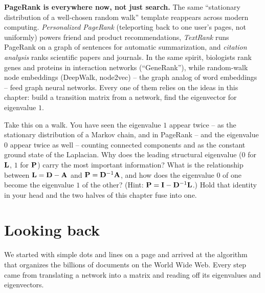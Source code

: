 \begin{applicationbox}
\textbf{PageRank is everywhere now, not just search.} The same ``stationary distribution of
a well-chosen random walk'' template reappears across modern computing.
\emph{Personalized PageRank} (teleporting back to one user's pages, not uniformly) powers
friend and product recommendations, \emph{TextRank} runs PageRank on a graph of sentences for
automatic summarization, and \emph{citation analysis} ranks scientific papers and journals.
In the same spirit, biologists rank genes and proteins in interaction networks (``GeneRank''),
while random-walk node embeddings (DeepWalk, node2vec) -- the graph analog of word embeddings
-- feed graph neural networks. Every one of them relies on the ideas in this chapter: build a
transition matrix from a network, find the eigenvector for eigenvalue $1$.
\end{applicationbox}

\begin{walkbox}
Take this on a walk. You have seen the eigenvalue $1$ appear twice -- as the stationary
distribution of a Markov chain, and in PageRank -- and the eigenvalue $0$ appear twice as
well -- counting connected components and as the constant ground state of the Laplacian.
Why does the leading structural eigenvalue ($0$ for $\mathbf{L}$, $1$ for $\mathbf{P}$) carry
the most important information? What is the relationship between $\mathbf{L} =
\mathbf{D}-\mathbf{A}$ and $\mathbf{P} = \mathbf{D}^{-1}\mathbf{A}$, and how does the eigenvalue $0$ of one
become the eigenvalue $1$ of the other? (Hint: $\mathbf{P} = \mathbf{I} - \mathbf{D}^{-1}\mathbf{L}$.)
Hold that identity in your head and the two halves of this chapter fuse into one.
\end{walkbox}

\section{Looking back}

We started with simple dots and lines on a page and arrived at the algorithm that
organizes the billions of documents on the World Wide Web. Every step came from
translating a network into a matrix and reading off its eigenvalues and
eigenvectors.

